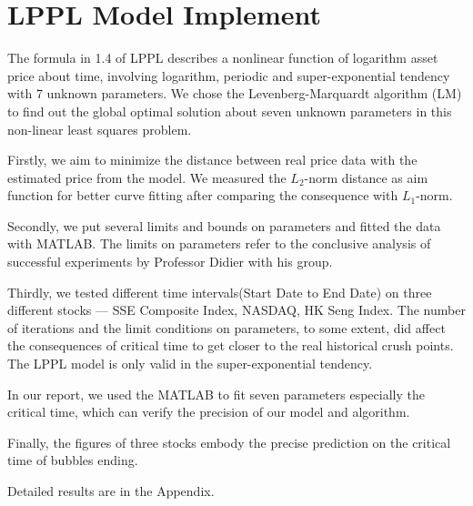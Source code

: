 \section{LPPL Model Implement}
The formula in 1.4 of LPPL describes a nonlinear function of logarithm asset price about time, involving logarithm, periodic and super-exponential tendency with 7 unknown parameters. We chose the Levenberg-Marquardt algorithm (LM) to find out the global optimal solution about seven unknown parameters in this non-linear least squares problem.

Firstly, we aim to minimize the distance between real price data with the estimated price from the model. We measured the $L_2$-norm distance as aim function for better curve fitting after comparing the consequence with $L_1$-norm.

Secondly, we put several limits and bounds on parameters and fitted the data with MATLAB. The limits on parameters refer to the conclusive analysis of successful experiments by Professor Didier with his group.

Thirdly, we tested different time intervals(Start Date to End Date) on three different stocks --- SSE Composite Index, NASDAQ, HK Seng Index. The number of iterations and the limit conditions on parameters, to some extent, did affect the consequences of critical time to get closer to the real historical crush points. The LPPL model is only valid in the super-exponential tendency.

In our report, we used the  MATLAB to fit seven parameters especially the critical time, which can verify the precision of our model and algorithm.

Finally, the figures of three stocks embody the precise prediction on the critical time of bubbles ending.

Detailed results are in the Appendix.